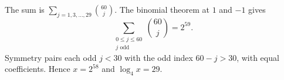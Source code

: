 The sum is $\sum_{j=1,3,\ldots,29}\binom{60}{j}$. The binomial theorem at $1$ and $-1$ gives
\[
\sum_{\substack{0\le j\le60\\j\text{ odd}}}\binom{60}{j}=2^{59}.
\]
Symmetry pairs each odd $j<30$ with the odd index $60-j>30$, with equal coefficients. Hence $x=2^{58}$ and $\boxed{\log_4x=29}$.
